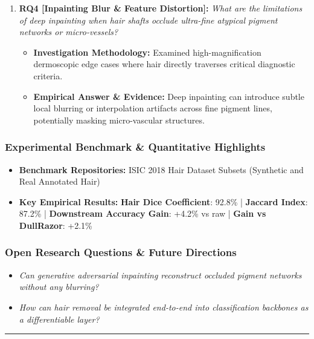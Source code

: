 \begin{enumerate}[label=\textbf{\arabic*.}, leftmargin=*]
\begin{itemize}[leftmargin=1.5em]
    \item \textbf{Empirical Answer \& Evidence:} Synthetic hair training generalized well, demonstrating robust segmentation across real dermoscopic hair artifacts without manual clinical mask annotations.
  \end{itemize}
  \item \textbf{RQ4 [Inpainting Blur \& Feature Distortion]:} \textit{What are the limitations of deep inpainting when hair shafts occlude ultra-fine atypical pigment networks or micro-vessels?}
  \begin{itemize}[leftmargin=1.5em]
    \item \textbf{Investigation Methodology:} Examined high-magnification dermoscopic edge cases where hair directly traverses critical diagnostic criteria.
    \item \textbf{Empirical Answer \& Evidence:} Deep inpainting can introduce subtle local blurring or interpolation artifacts across fine pigment lines, potentially masking micro-vascular structures.
  \end{itemize}
\end{enumerate}

\subsubsection*{Experimental Benchmark \& Quantitative Highlights}
\begin{itemize}[leftmargin=*]
  \item \textbf{Benchmark Repositories:} ISIC 2018 Hair Dataset Subsets (Synthetic and Real Annotated Hair)
  \item \textbf{Key Empirical Results:} \textbf{Hair Dice Coefficient}: 92.8\% \quad | \quad \textbf{Jaccard Index}: 87.2\% \quad | \quad \textbf{Downstream Accuracy Gain}: +4.2\% vs raw \quad | \quad \textbf{Gain vs DullRazor}: +2.1\%
\end{itemize}

\subsubsection*{Open Research Questions \& Future Directions}
\begin{itemize}[leftmargin=*]
  \item \textit{Can generative adversarial inpainting reconstruct occluded pigment networks without any blurring?}
  \item \textit{How can hair removal be integrated end-to-end into classification backbones as a differentiable layer?}
\end{itemize}
\vspace{0.8em}\hrule\vspace{1.2em}
